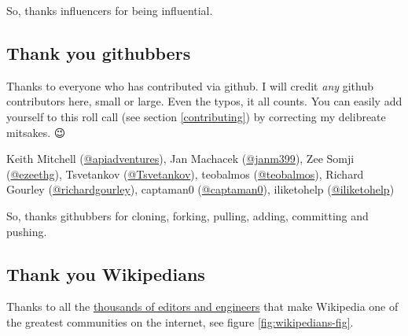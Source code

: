 \documentclass[
]{book}
\begin{document}
So, thanks influencers for being influential. 🙏

\hypertarget{github}{%
\subsection{Thank you githubbers}\label{github}}

Thanks to everyone who has contributed via github. I will credit \emph{any} github contributors here, small or large. Even the typos, it all counts. You can easily add yourself to this roll call (see section \ref{contributing}) by correcting my delibreate mitsakes. 😉

Keith Mitchell (\href{https://github.com/apiadventures}{@apiadventures}), Jan Machacek (\href{https://github.com/janm399}{@janm399}), Zee Somji (\href{https://github.com/ezeethg}{@ezeethg}), Tsvetankov (\href{https://github.com/Tsvetankov}{@Tsvetankov}), teobalmos (\href{https://github.com/teobalmos}{@teobalmos}), Richard Gourley (\href{https://github.com/richardgourley}{@richardgourley}), captaman0 (\href{https://github.com/captaman0}{@captaman0}), iliketohelp (\href{https://github.com/iliketohelp}{@iliketohelp})

So, thanks githubbers for cloning, forking, pulling, adding, committing and pushing. 🙏

\hypertarget{wikipedians}{%
\subsection{Thank you Wikipedians}\label{wikipedians}}

Thanks to all the \href{https://en.wikipedia.org/wiki/Wikipedia:Wikipedians}{thousands of editors and engineers} that make Wikipedia one of the greatest communities on the internet, see figure \ref{fig:wikipedians-fig}.
\end{document}
